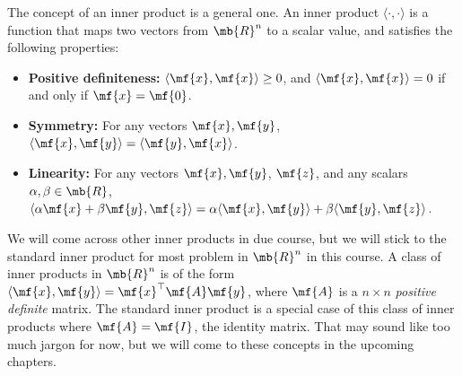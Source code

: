 The concept of an inner product is a general one. An inner product $\langle \cdot, \cdot \rangle$ is a function that maps two vectors from $\mb{R}^n$ to a scalar value, and satisfies the following properties:
\begin{itemize}
    \item \textbf{Positive definiteness:} $\langle \mf{x}, \mf{x} \rangle \geq 0$, and $\langle \mf{x}, \mf{x} \rangle = 0$ if and only if $\mf{x} = \mf{0}$.
    \item \textbf{Symmetry:} For any vectors $\mf{x}, \mf{y}$, $\langle \mf{x}, \mf{y} \rangle = \langle \mf{y}, \mf{x} \rangle$.
    \item \textbf{Linearity:} For any vectors $\mf{x}, \mf{y}$, $\mf{z}$, and any scalars $\alpha, \beta \in \mb{R}$, $\langle \alpha\mf{x} + \beta \mf{y}, \mf{z} \rangle = \alpha \langle \mf{x}, \mf{y}\rangle + \beta \langle \mf{y}, \mf{z}\rangle$.
\end{itemize}
We will come across other inner products in due course, but we will stick to the standard inner product for most problem in $\mb{R}^n$ in this course. A class of inner products in $\mb{R}^n$ is of the form $\langle \mf{x}, \mf{y}\rangle = \mf{x}^\top\mf{A}\mf{y}$, where $\mf{A}$ is a $n \times n$ \textit{positive definite} matrix. The standard inner product is a special case of this class of inner products where $\mf{A} = \mf{I}$, the identity matrix. That may sound like too much jargon for now, but we will come to these concepts in the upcoming chapters.

